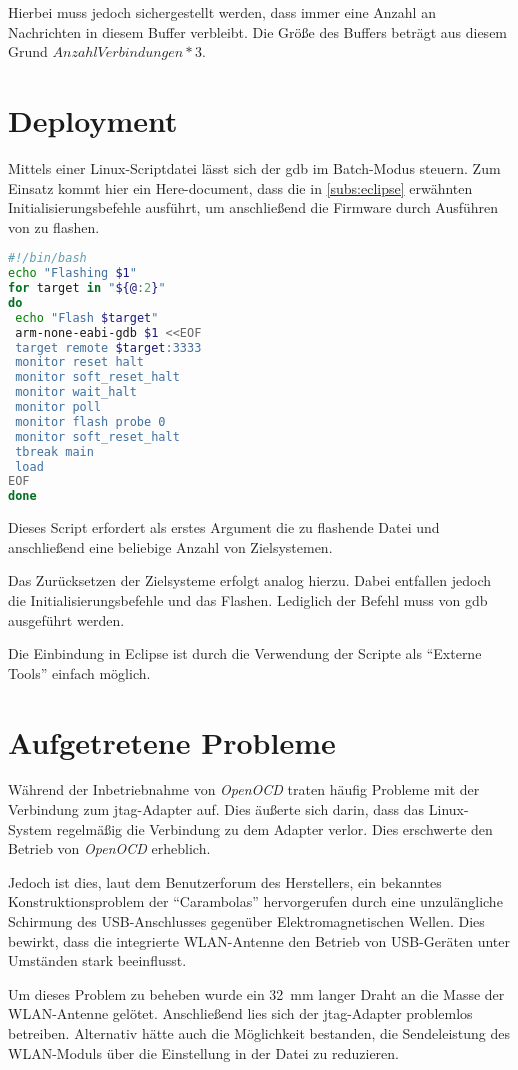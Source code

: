 Hierbei muss jedoch sichergestellt werden, dass immer eine Anzahl an Nachrichten
in diesem Buffer verbleibt. Die Größe des Buffers beträgt aus diesem Grund
$\mathit{AnzahlVerbindungen}*3$.

\section{Deployment}
Mittels einer Linux-Scriptdatei lässt sich der \gls{gdb} im Batch-Modus steuern.
Zum Einsatz kommt hier ein Here-document, dass die in \autoref{subs:eclipse}
erwähnten Initialisierungsbefehle ausführt, um anschließend die Firmware durch
Ausführen von  zu flashen.
\begin{lstlisting}[language=sh]
#!/bin/bash
echo "Flashing $1"
for target in "${@:2}"
do
 echo "Flash $target"
 arm-none-eabi-gdb $1 <<EOF
 target remote $target:3333
 monitor reset halt
 monitor soft_reset_halt
 monitor wait_halt
 monitor poll
 monitor flash probe 0
 monitor soft_reset_halt
 tbreak main
 load
EOF
done
\end{lstlisting}
Dieses Script erfordert als erstes Argument die zu flashende Datei und
anschließend eine beliebige Anzahl von Zielsystemen.

Das Zurücksetzen der Zielsysteme erfolgt analog hierzu. Dabei entfallen jedoch
die Initialisierungsbefehle und das Flashen. Lediglich der Befehl
 muss von gdb ausgeführt werden.

Die Einbindung in Eclipse ist durch die Verwendung der Scripte als "`Externe
Tools"' einfach möglich.
\section{Aufgetretene Probleme}
Während der Inbetriebnahme von \emph{OpenOCD} traten häufig Probleme mit der
Verbindung zum \gls{jtag}-Adapter auf. Dies äußerte sich darin, dass das
Linux-System regelmäßig die Verbindung zu dem Adapter verlor. Dies
erschwerte den Betrieb von \emph{OpenOCD} erheblich.

Jedoch ist dies, laut dem Benutzerforum des Herstellers, ein bekanntes
Konstruktionsproblem der "`Carambolas"' hervorgerufen durch eine unzulängliche
Schirmung des USB-Anschlusses gegenüber Elektromagnetischen Wellen.
Dies bewirkt, dass die integrierte WLAN-Antenne den Betrieb von USB-Geräten
unter Umständen stark beeinflusst.

Um dieses Problem zu beheben wurde ein \SI{32}{\mm} langer Draht an die Masse
der WLAN-Antenne gelötet. Anschließend lies sich der \gls{jtag}-Adapter
problemlos betreiben. Alternativ hätte auch die Möglichkeit bestanden, die
Sendeleistung des WLAN-Moduls über die Einstellung 
in der Datei  zu reduzieren.
